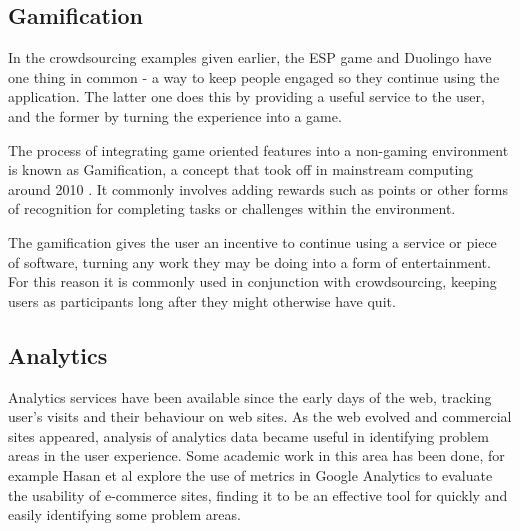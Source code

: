 %

\subsection{Gamification}

In the crowdsourcing examples given earlier, the ESP game and Duolingo have one
thing in common - a way to keep people engaged so they continue using the
application. The latter one does this by providing a useful service to the
user, and the former by turning the experience into a game.

The process of integrating game oriented features into a non-gaming environment
is known as Gamification, a concept that took off in mainstream computing
around 2010 \cite{gamification-trends}. It commonly involves adding rewards
such as points or other forms of recognition for completing tasks or challenges
within the environment.

The gamification gives the user an incentive to continue using a service or
piece of software, turning any work they may be doing into a form of 
entertainment. For this reason it is commonly used in conjunction with
crowdsourcing, keeping users as participants long after they might otherwise
have quit.

\subsection{Analytics}

Analytics services have been available since the early days of the web,
tracking user's visits and their behaviour on web sites. As the web evolved and
commercial sites appeared, analysis of analytics data became useful in
identifying problem areas in the user experience. Some academic work in this
area has been done, for example Hasan et al \cite{hasan2009using} explore the
use of metrics in Google Analytics to evaluate the usability of e-commerce
sites, finding it to be an effective tool for quickly and easily identifying
some problem areas.

